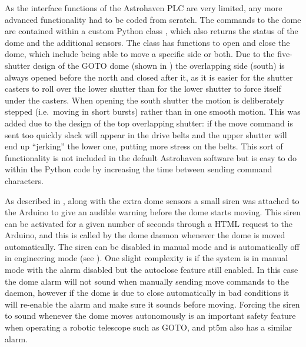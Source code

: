 \begin{colsection}
\begin{colsection}
As the interface functions of the Astrohaven PLC are very limited, any more advanced functionality had to be coded from scratch. The commands to the dome are contained within a custom Python class , which also returns the status of the dome and the additional sensors. The class has functions to open and close the dome, which include being able to move a specific side or both. Due to the five-shutter design of the GOTO dome (shown in ) the overlapping side (south) is always opened before the north and closed after it, as it is easier for the shutter casters to roll over the lower shutter than for the lower shutter to force itself under the casters. When opening the south shutter the motion is deliberately stepped (i.e.\ moving in short bursts) rather than in one smooth motion. This was added due to the design of the top overlapping shutter: if the move command is sent too quickly slack will appear in the drive belts and the upper shutter will end up ``jerking'' the lower one, putting more stress on the belts. This sort of functionality is not included in the default Astrohaven software but is easy to do within the Python code by increasing the time between sending command characters.

As described in , along with the extra dome sensors a small siren was attached to the Arduino to give an audible warning before the dome starts moving. This siren can be activated for a given number of seconds through a HTML request to the Arduino, and this is called by the dome daemon whenever the dome is moved automatically. The siren can be disabled in manual mode and is automatically off in engineering mode (see ). One slight complexity is if the system is in manual mode with the alarm disabled but the autoclose feature still enabled. In this case the dome alarm will not sound when manually sending move commands to the daemon, however if the dome is due to close automatically in bad conditions it will re-enable the alarm and make sure it sounds before moving. Forcing the siren to sound whenever the dome moves autonomously is an important safety feature when operating a robotic telescope such as GOTO, and pt5m also has a similar alarm.


\end{colsection}
\end{colsection}
